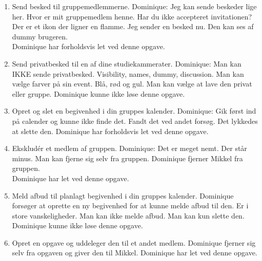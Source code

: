 \documentclass[12pt]{article}
\begin{document}
\begin{enumerate}
\item Send besked til gruppemedlemmerne.
Dominique: Jeg kan sende beskeder lige her. Hvor er mit gruppemedlem henne. Har du ikke accepteret invitationen? Der er et ikon der ligner en flamme. Jeg sender en besked nu. Den kan ses af dummy brugeren.\\
Dominique har forholdsvis let ved denne opgave.

\item Send privatbesked til en af dine studiekammerater.
Dominique: Man kan IKKE sende privatbesked. Visibility, names, dummy, discussion. Man kan vælge farver på sin event. Blå, rød og gul. Man kan vælge at lave den privat eller gruppe.
Dominique kunne ikke løse denne opgave.\\

\item Opret og slet en begivenhed i din gruppes kalender.
Dominique: Gik først ind på calender og kunne ikke finde det. Fandt det ved andet forsøg. Det lykkedes at slette den.
Dominique har forholdsvis let ved denne opgave.\\

\item Ekskludér et medlem af gruppen.
Dominique: Det er meget nemt. Der står minus. Man kan fjerne sig selv fra gruppen. Dominique fjerner Mikkel fra gruppen.\\
Dominique har let ved denne opgave.

\item Meld afbud til planlagt begivenhed i din gruppes kalender.
Dominique forsøger at oprette en ny begivenhed for at kunne melde afbud til den. Er i store vanskeligheder. Man kan ikke melde afbud. Man kan kun slette den.\\
Dominique kunne ikke løse denne opgave.\\

\item Opret en opgave og uddeleger den til et andet medlem.
Dominique fjerner sig selv fra opgaven og giver den til Mikkel.
Dominique har let ved denne opgave.\\

\end{enumerate}
\end{document}
